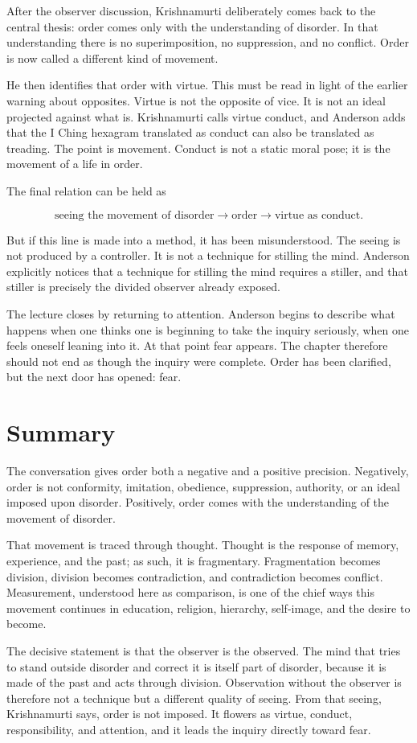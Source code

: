 After the observer discussion, Krishnamurti deliberately comes back to the central thesis: order comes only with the understanding of disorder. In that understanding there is no superimposition, no suppression, and no conflict. Order is now called a different kind of movement.

He then identifies that order with virtue. This must be read in light of the earlier warning about opposites. Virtue is not the opposite of vice. It is not an ideal projected against what is. Krishnamurti calls virtue conduct, and Anderson adds that the I Ching hexagram translated as conduct can also be translated as treading. The point is movement. Conduct is not a static moral pose; it is the movement of a life in order.

The final relation can be held as

\begin{equation}
\text{seeing the movement of disorder}
\longrightarrow
\text{order}
\longrightarrow
\text{virtue as conduct}.
\end{equation}

But if this line is made into a method, it has been misunderstood. The seeing is not produced by a controller. It is not a technique for stilling the mind. Anderson explicitly notices that a technique for stilling the mind requires a stiller, and that stiller is precisely the divided observer already exposed.

The lecture closes by returning to attention. Anderson begins to describe what happens when one thinks one is beginning to take the inquiry seriously, when one feels oneself leaning into it. At that point fear appears. The chapter therefore should not end as though the inquiry were complete. Order has been clarified, but the next door has opened: fear.

\section{Summary}

The conversation gives order both a negative and a positive precision. Negatively, order is not conformity, imitation, obedience, suppression, authority, or an ideal imposed upon disorder. Positively, order comes with the understanding of the movement of disorder.

That movement is traced through thought. Thought is the response of memory, experience, and the past; as such, it is fragmentary. Fragmentation becomes division, division becomes contradiction, and contradiction becomes conflict. Measurement, understood here as comparison, is one of the chief ways this movement continues in education, religion, hierarchy, self-image, and the desire to become.

The decisive statement is that the observer is the observed. The mind that tries to stand outside disorder and correct it is itself part of disorder, because it is made of the past and acts through division. Observation without the observer is therefore not a technique but a different quality of seeing. From that seeing, Krishnamurti says, order is not imposed. It flowers as virtue, conduct, responsibility, and attention, and it leads the inquiry directly toward fear.